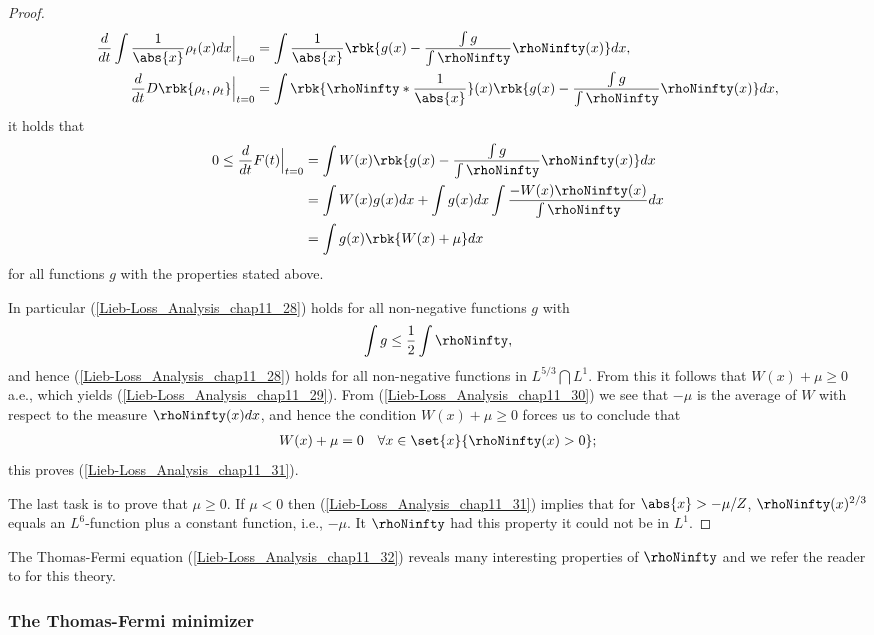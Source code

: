 \documentclass[openany, a4paper, oneside]{jsbook}
\begin{document}
\begin{proof}
\begin{align}
 \frac{d}{dt} \int \frac{1}{\abs{x}} \rho_t (x) dx \Big |_{t = 0}
 &=
 \int \frac{1}{\abs{x}} \rbk{g (x) - \frac{\int g}{\int \rhoNinfty} \rhoNinfty (x)} dx, \\
 \frac{d}{dt} D \rbk{\rho_t, \rho_t} \Big |_{t = 0}
 &=
 \int \rbk{\rhoNinfty * \frac{1}{\abs{x}}} (x) \rbk{g (x) - \frac{\int g}{\int \rhoNinfty} \rhoNinfty (x)} dx,
\end{align}
it holds that
\begin{align}
 0 \leq
 \frac{d}{dt} F (t) \Big |_{t = 0}
 &=
 \int W (x) \rbk{g (x) - \frac{\int g}{\int \rhoNinfty} \rhoNinfty (x)} dx \\
 &=
 \int W (x) g (x) dx + \int g (x) dx \int \frac{- W (x) \rhoNinfty (x)}{\int \rhoNinfty} dx \\
 &=
 \int g (x) \rbk{W (x) + \mu} dx \label{Lieb-Loss_Analysis_chap11_28}
\end{align}
for all functions $g$ with the properties stated above.

In particular (\ref{Lieb-Loss_Analysis_chap11_28}) holds for all non-negative functions $g$ with
\begin{align}
 \int g \leq \frac{1}{2} \int \rhoNinfty,
\end{align}
and hence (\ref{Lieb-Loss_Analysis_chap11_28}) holds for all non-negative functions in $L^{5/3} \bigcap L^{1}$.
From this it follows that $W (x) + \mu \geq 0$ a.e., which yields (\ref{Lieb-Loss_Analysis_chap11_29}).
From (\ref{Lieb-Loss_Analysis_chap11_30}) we see that $- \mu$ is the average of $W$ with respect to the measure $\rhoNinfty (x) dx$,
and hence the condition $W (x) + \mu \geq 0$ forces us to conclude that
\begin{align}
 W (x) + \mu = 0 \quad \forall x \in \set{x}{\rhoNinfty (x) > 0};
\end{align}
this proves (\ref{Lieb-Loss_Analysis_chap11_31}).

The last task is to prove that $\mu \geq 0$.
If $\mu < 0$ then (\ref{Lieb-Loss_Analysis_chap11_31}) implies that for $\abs{x} > - \mu / Z$, $\rhoNinfty (x)^{2/3}$ equals
an $L^6$-function plus a constant function, i.e., $- \mu$.
It $\rhoNinfty$ had this property it could not be in $L^1$.
\end{proof}

The Thomas-Fermi equation (\ref{Lieb-Loss_Analysis_chap11_32}) reveals many interesting properties of $\rhoNinfty$
and we refer the reader to \cite{LiebSimon1} for this theory.
\subsubsection{The Thomas-Fermi minimizer \label{Lieb-Loss_Analysis_chap11_39}}
\end{document}
